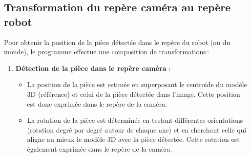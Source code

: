 \subsection{Transformation du repère caméra au repère robot}

Pour obtenir la position de la pièce détectée dans le repère du robot (ou du monde), le programme effectue une composition de transformations :

\begin{enumerate}
    \item \textbf{Détection de la pièce dans le repère caméra} :
          \begin{itemize}
              \item La position de la pièce est estimée en superposant le centroïde du modèle 3D (référence) et celui de la pièce détectée dans l'image. Cette position est donc exprimée dans le repère de la caméra.
              \item La rotation de la pièce est déterminée en testant différentes orientations (rotation degré par degré autour de chaque axe) et en cherchant celle qui aligne au mieux le modèle 3D avec la pièce détectée. Cette rotation est également exprimée dans le repère de la caméra.

              \inputminted[firstline=176, lastline=181, fontsize=\small, linenos, frame=lines, breaklines, bgcolor=gray!10]{python}{assets/code/piece_detection.py}
              \label{lst:piece_detection}


\end{itemize}
\end{enumerate}
